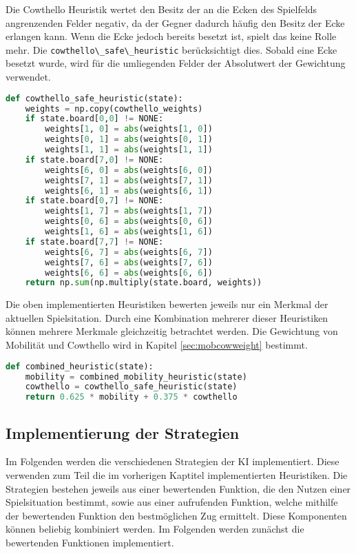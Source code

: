 Die Cowthello Heuristik wertet den Besitz der an die Ecken des
Spielfelds angrenzenden Felder negativ, da der Gegner dadurch häufig den
Besitz der Ecke erlangen kann. Wenn die Ecke jedoch bereits besetzt ist,
spielt das keine Rolle mehr. Die
\passthrough{\lstinline!cowthello\_safe\_heuristic!} berücksichtigt
dies. Sobald eine Ecke besetzt wurde, wird für die umliegenden Felder
der Absolutwert der Gewichtung verwendet.

\begin{lstlisting}[language=Python]
def cowthello_safe_heuristic(state):
    weights = np.copy(cowthello_weights)
    if state.board[0,0] != NONE:
        weights[1, 0] = abs(weights[1, 0])
        weights[0, 1] = abs(weights[0, 1])
        weights[1, 1] = abs(weights[1, 1])
    if state.board[7,0] != NONE:
        weights[6, 0] = abs(weights[6, 0])
        weights[7, 1] = abs(weights[7, 1])
        weights[6, 1] = abs(weights[6, 1])
    if state.board[0,7] != NONE:
        weights[1, 7] = abs(weights[1, 7])
        weights[0, 6] = abs(weights[0, 6])
        weights[1, 6] = abs(weights[1, 6])
    if state.board[7,7] != NONE:
        weights[6, 7] = abs(weights[6, 7])
        weights[7, 6] = abs(weights[7, 6])
        weights[6, 6] = abs(weights[6, 6])
    return np.sum(np.multiply(state.board, weights))
\end{lstlisting}

Die oben implementierten Heuristiken bewerten jeweils nur ein Merkmal
der aktuellen Spielsitation. Durch eine Kombination mehrerer dieser
Heuristiken können mehrere Merkmale gleichzeitig betrachtet werden. Die
Gewichtung von Mobilität und Cowthello wird in Kapitel
\ref{sec:mobcowweight} bestimmt.

\begin{lstlisting}[language=Python]
def combined_heuristic(state):
    mobility = combined_mobility_heuristic(state)
    cowthello = cowthello_safe_heuristic(state)
    return 0.625 * mobility + 0.375 * cowthello
\end{lstlisting}

\hypertarget{implementierung-der-strategien}{%
\subsection{Implementierung der
Strategien}\label{implementierung-der-strategien}}

Im Folgenden werden die verschiedenen Strategien der \ac{KI}
implementiert. Diese verwenden zum Teil die im vorherigen Kaptitel
implementierten Heuristiken. Die Strategien bestehen jeweils aus einer
bewertenden Funktion, die den Nutzen einer Spielsituation bestimmt,
sowie aus einer aufrufenden Funktion, welche mithilfe der bewertenden
Funktion den bestmöglichen Zug ermittelt. Diese Komponenten können
beliebig kombiniert werden. Im Folgenden werden zunächst die bewertenden
Funktionen implementiert.

